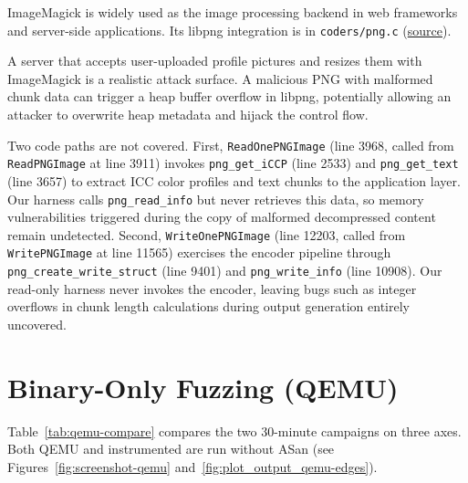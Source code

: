 \documentclass[letterpaper,twocolumn,10pt]{article}
\begin{document}

ImageMagick is widely used as the image processing backend in web
frameworks and server-side applications. Its libpng integration is in \lstinline|coders/png.c| (\href{https://github.com/ImageMagick/ImageMagick/blob/6dc0130dbbde34b13126bc4fe25789f894b9e0c1/coders/png.c}{source}).

A server that accepts user-uploaded profile pictures and resizes them with ImageMagick is a realistic attack surface. A malicious PNG with malformed chunk data can trigger a heap buffer overflow in libpng, potentially allowing an attacker to overwrite heap metadata and hijack the control flow.

Two code paths are not covered. First, \lstinline|ReadOnePNGImage| (line 3968, called from \lstinline|ReadPNGImage| at line 3911) invokes \lstinline|png_get_iCCP| (line 2533) and \lstinline|png_get_text|
(line 3657) to extract ICC color profiles and text chunks to the
application layer. Our harness calls \lstinline|png_read_info| but never retrieves this data, so memory vulnerabilities triggered during the copy of malformed decompressed content remain undetected. Second, \lstinline|WriteOnePNGImage| (line 12203, called from \lstinline|WritePNGImage| at line 11565) exercises the encoder pipeline through \lstinline|png_create_write_struct| (line 9401) and \lstinline|png_write_info| (line 10908). Our read-only harness never invokes the encoder, leaving bugs such as integer overflows in chunk length calculations during output generation entirely uncovered.



\section{Binary-Only Fuzzing (QEMU)}
\label{sec:q7}
Table~\ref{tab:qemu-compare} compares the two 30-minute campaigns on three axes. Both QEMU and instrumented are run without ASan (see Figures~\ref{fig:screenshot-qemu} and~\ref{fig:plot_output_qemu-edges}). 
\end{document}
